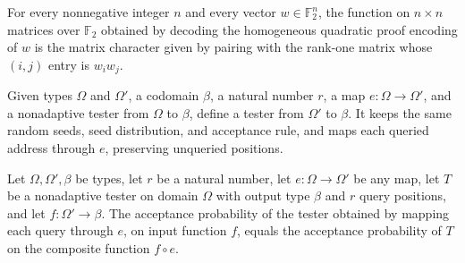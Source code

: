 \begin{theorem}
\label{FABL.quadraticMatrixProofFunction_encodeHomogeneousQuadraticProof}
\leanok
{}
For every nonnegative integer $n$ and every vector $w\in\mathbb{F}_2^n$, the function on
$n\times n$ matrices over $\mathbb{F}_2$ obtained by decoding the homogeneous quadratic
proof encoding of $w$ is the matrix character given by pairing with the rank-one matrix
whose $(i,j)$ entry is $w_iw_j$.
\end{theorem}

\begin{definition}
\label{FABL.reindexDomainFunctionTester}
\leanok
{}
Given types $\Omega$ and $\Omega'$, a codomain $\beta$, a natural number $r$, a map $e :
\Omega \to \Omega'$, and a nonadaptive tester from $\Omega$ to $\beta$, define a tester
from $\Omega'$ to $\beta$. It keeps the same random seeds, seed distribution, and
acceptance rule, and maps each queried address through $e$, preserving unqueried
positions.
\end{definition}

\begin{theorem}
\label{FABL.reindexDomainFunctionTester_acceptanceProbability}
\leanok
{}
Let $\Omega,\Omega',\beta$ be types, let $r$ be a natural number, let
$e\colon\Omega\to\Omega'$ be any map, let $T$ be a nonadaptive tester on domain $\Omega$
with output type $\beta$ and $r$ query positions, and let $f\colon\Omega'\to\beta$. The
acceptance probability of the tester obtained by mapping each query through $e$, on
input function $f$, equals the acceptance probability of $T$ on the composite function
$f\circ e$.
\end{theorem}

